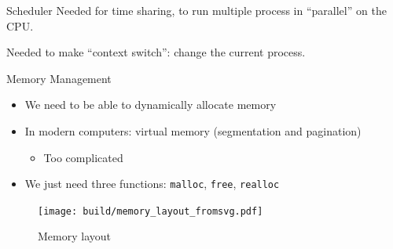 \documentclass{beamer}
\begin{document}
      \begin{frame}{Scheduler}
        Needed for time sharing, to run multiple process in ``parallel'' on the
        CPU.

        \begin{figure}
            \centering
        \end{figure}

        Needed to make ``context switch'': change the current process.
      \end{frame}

      \begin{frame}{Memory Management}
        \begin{itemize}
          \item We need to be able to dynamically allocate memory
          \item In modern computers: virtual memory (segmentation and pagination)
            \begin{itemize}
              \item Too complicated
            \end{itemize}
          \item We just need three functions: \texttt{malloc}, \texttt{free},
            \texttt{realloc}
        \end{itemize}
      \end{frame}

      \begin{frame}[plain]
        \begin{figure}
          \begin{minipage}[c]{0.5\textwidth}
            \caption{Memory layout}
          \end{minipage}\hfill
          \begin{minipage}[c]{0.5\textwidth}
            \texttt{[image: build/memory\_layout\_fromsvg.pdf]}
          \end{minipage}
        \end{figure}
      \end{frame}
\end{document}
